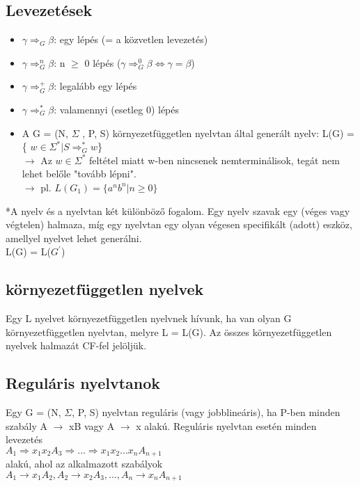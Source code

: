 \documentclass{article}
\begin{document}
    \subsection{Levezetések}

    \begin{itemize}
        \item $ \gamma \Rightarrow _G \beta $: egy lépés (= a közvetlen levezetés)
        \item $ \gamma \Rightarrow _G^n \beta $: n $ \ge $ 0 lépés ($ \gamma \Rightarrow _G^0 \beta \Leftrightarrow \gamma = \beta $)
        \item $ \gamma \Rightarrow _G^+ \beta $: legalább egy lépés
        \item $ \gamma \Rightarrow _G^* \beta $: valamennyi (esetleg 0) lépés
        \item A G = (N, $ \Sigma $ , P, S) környezetfüggetlen nyelvtan által generált nyelv: L(G) = \{ $ w \in \Sigma ^* | S \Rightarrow _G^* w $\}\\
        $ \rightarrow $ Az $ w \in \Sigma ^* $ feltétel miatt w-ben nincsenek nemterminálisok, tegát nem lehet belőle "tovább lépni". \\$ \rightarrow $ pl.
        $ L(G_1) = \{ a^n b^n | n \ge 0 \} $
    \end{itemize}

    *A nyelv és a nyelvtan két különböző fogalom. Egy nyelv szavak egy (véges vagy végtelen) halmaza, míg egy nyelvtan egy olyan végesen specifikált (adott) eszköz, amellyel nyelvet lehet generálni.\\
    L(G) = L($ G^{'} $)

    \subsection{környezetfüggetlen nyelvek}

    Egy L nyelvet környezetfüggetlen nyelvnek hívunk, ha van olyan G környezetfüggetlen nyelvtan, melyre L = L(G). Az összes környezetfüggetlen nyelvek halmazát CF-fel jelöljük.

    \subsection{Reguláris nyelvtanok}
    

    Egy G = (N, $ \Sigma $, P, S) nyelvtan reguláris (vagy jobblineáris), ha P-ben minden szabály A $ \rightarrow $ xB vagy A $ \rightarrow $ x alakú.
    Reguláris nyelvtan esetén minden levezetés \\ \newline
    \indent $ A _1 \Rightarrow x_1 x_2 A_3 \Rightarrow ... \Rightarrow x_1 x_2 ... x_n A_{n+1} $ \\ \newline
    alakú, ahol az alkalmazott szabályok \\ \newline
    \indent $ A_1 \rightarrow x_1 A_2, A_2 \rightarrow x_2 A_3, ..., A_n \rightarrow x_n A_{n+1} $ \\
\end{document}

